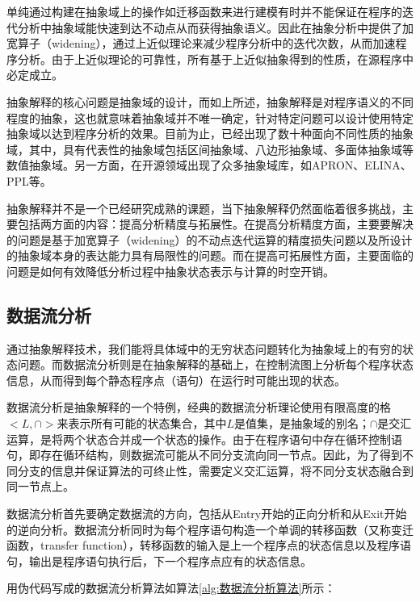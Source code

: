  单纯通过构建在抽象域上的操作如迁移函数来进行建模有时并不能保证在程序的迭代分析中抽象域能快速到达不动点从而获得抽象语义。因此在抽象分析中提供了加宽算子（widening），通过上近似理论来减少程序分析中的迭代次数，从而加速程序分析。由于上近似理论的可靠性，所有基于上近似抽象得到的性质，在源程序中必定成立。
 
 抽象解释的核心问题是抽象域的设计，而如上所述，抽象解释是对程序语义的不同程度的抽象，这也就意味着抽象域并不唯一确定，针对特定问题可以设计使用特定抽象域以达到程序分析的效果。目前为止，已经出现了数十种面向不同性质的抽象域，其中，具有代表性的抽象域包括区间抽象域、八边形抽象域、多面体抽象域等数值抽象域\cite{张健2019程序分析研究进展}。另一方面，在开源领域出现了众多抽象域库，如APRON\cite{jeannet2009apron}、ELINA\cite{singh2017practical}、PPL\cite{bagnara2006parma}等。
 
 抽象解释并不是一个已经研究成熟的课题，当下抽象解释仍然面临着很多挑战，主要包括两方面的内容：提高分析精度与拓展性。在提高分析精度方面，主要要解决的问题是基于加宽算子（widening）的不动点迭代运算的精度损失问题以及所设计的抽象域本身的表达能力具有局限性的问题。而在提高可拓展性方面，主要面临的问题是如何有效降低分析过程中抽象状态表示与计算的时空开销。
 
 \subsection{数据流分析}
 
 通过抽象解释技术，我们能将具体域中的无穷状态问题转化为抽象域上的有穷的状态问题。而数据流分析则是在抽象解释的基础上，在控制流图上分析每个程序状态信息，从而得到每个静态程序点（语句）在运行时可能出现的状态。
 
 数据流分析是抽象解释的一个特例，经典的数据流分析理论\cite{aho1986compilers}使用有限高度的格$ <L,∩> $来表示所有可能的状态集合，其中$ L $是值集，是抽象域的别名；$ ∩ $是交汇运算，是将两个状态合并成一个状态的操作。由于在程序语句中存在循环控制语句，即存在循环结构，则数据流可能从不同分支流向同一节点。因此，为了得到不同分支的信息并保证算法的可终止性，需要定义交汇运算，将不同分支状态融合到同一节点上。
 
 数据流分析首先要确定数据流的方向，包括从Entry开始的正向分析和从Exit开始的逆向分析。数据流分析同时为每个程序语句构造一个单调的转移函数（又称变迁函数，transfer function），转移函数的输入是上一个程序点的状态信息以及程序语句，输出是程序语句执行后，下一个程序点应有的状态信息。
 
 用伪代码写成的数据流分析算法\cite{cooper2004iterative}如算法\ref{alg:数据流分析算法}所示：
 
